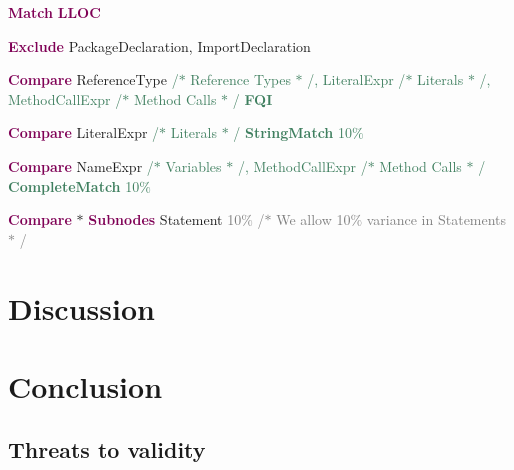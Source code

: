 \documentclass[sigplan,10pt,review,anonymous]{acmart}
\begin{document}
\textbf{\textcolor[HTML]{7F0055}{Match}} \textbf{\textcolor[HTML]{7F0055}{LLOC}}\par

\textbf{\textcolor[HTML]{7F0055}{Exclude}} PackageDeclaration, ImportDeclaration\par

\textbf{\textcolor[HTML]{7F0055}{Compare}} ReferenceType \textcolor[HTML]{3F7F5F}{/$\ast$  Reference Types $\ast$ /, LiteralExpr /$\ast$  Literals $\ast$ /, MethodCallExpr /$\ast$  Method Calls $\ast$ / \textbf{FQI}}\par

\textbf{\textcolor[HTML]{7F0055}{Compare}} LiteralExpr \textcolor[HTML]{3F7F5F}{/$\ast$  Literals $\ast$ / \textbf{StringMatch} 10$\%$ }\par

\textbf{\textcolor[HTML]{7F0055}{Compare}} NameExpr \textcolor[HTML]{3F7F5F}{/$\ast$  Variables $\ast$ /, MethodCallExpr /$\ast$  Method Calls $\ast$ / \textbf{CompleteMatch} 10$\%$ }\par

\textbf{\textcolor[HTML]{7F0055}{Compare}} $\ast$  \textbf{\textcolor[HTML]{7F0055}{Subnodes}} Statement \textcolor[HTML]{7D7D7D}{10$\%$  /$\ast$  We allow 10$\%$  variance in Statements $\ast$ /}\par


\section{Discussion}

\section{Conclusion}

\subsection{Threats to validity}



%


%

\end{document}
